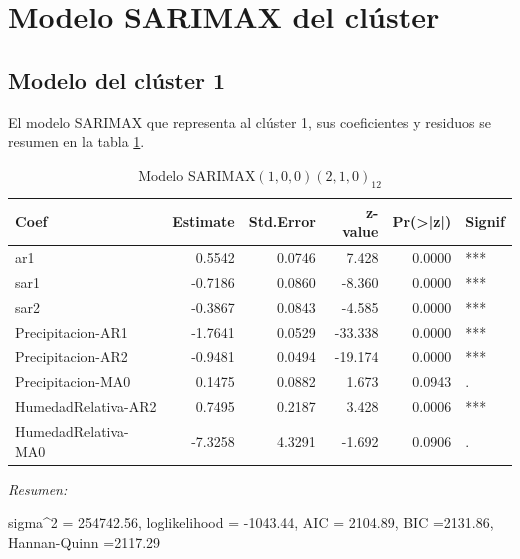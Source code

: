 \documentclass[12pt,oneside]{book}\usepackage[]{graphicx}\usepackage[]{color}
\newenvironment{knitrout}{}{} %
\theoremstyle{definition} %
\begin{document}
\section{Modelo SARIMAX del clúster}
\label{ap:sarimax}

\subsection{Modelo del clúster 1}

El modelo SARIMAX que representa al clúster 1, sus coeficientes y residuos se resumen en la tabla \ref{tab:sarimax_cl1}.

\begin{knitrout}
\color{fgcolor}\begin{table}

\caption{\label{tab:unnamed-chunk-96}\label{tab:sarimax_cl1}Modelo SARIMAX$(1,0,0)(2,1,0)_{12}$}
\centering
\begin{threeparttable}
\begin{tabular}[t]{lrrrrl}
\toprule
Coef & Estimate & Std.Error & z-value & Pr(>|z|) & Signif\\
\midrule
\rowcolor{gray!6}  ar1 & 0.5542 & 0.0746 & 7.428 & 0.0000 & ***\\
sar1 & -0.7186 & 0.0860 & -8.360 & 0.0000 & ***\\
\rowcolor{gray!6}  sar2 & -0.3867 & 0.0843 & -4.585 & 0.0000 & ***\\
Precipitacion-AR1 & -1.7641 & 0.0529 & -33.338 & 0.0000 & ***\\
\rowcolor{gray!6}  Precipitacion-AR2 & -0.9481 & 0.0494 & -19.174 & 0.0000 & ***\\
\addlinespace
Precipitacion-MA0 & 0.1475 & 0.0882 & 1.673 & 0.0943 & .\\
\rowcolor{gray!6}  HumedadRelativa-AR2 & 0.7495 & 0.2187 & 3.428 & 0.0006 & ***\\
HumedadRelativa-MA0 & -7.3258 & 4.3291 & -1.692 & 0.0906 & .\\
\bottomrule
\end{tabular}
\begin{tablenotes}
\item \textit{Resumen:} 
\item sigma\textasciicircum{}2 = 254742.56, loglikelihood = -1043.44, AIC = 2104.89, BIC =2131.86, Hannan-Quinn =2117.29
\end{tablenotes}
\end{threeparttable}
\end{table}


\end{knitrout}
\end{document}
